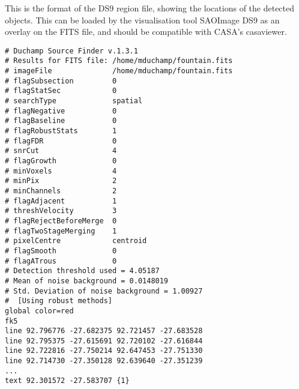 %
%
%
%
\label{app-ds9}

This is the format of the DS9 region file, showing the locations
of the detected objects. This can be loaded by the visualisation tool
SAOImage DS9 as an overlay on the FITS file, and should be compatible
with CASA's casaviewer.

\begin{verbatim}
# Duchamp Source Finder v.1.3.1
# Results for FITS file: /home/mduchamp/fountain.fits
# imageFile              /home/mduchamp/fountain.fits
# flagSubsection         0
# flagStatSec            0
# searchType             spatial
# flagNegative           0
# flagBaseline           0
# flagRobustStats        1
# flagFDR                0
# snrCut                 4
# flagGrowth             0
# minVoxels              4
# minPix                 2
# minChannels            2
# flagAdjacent           1
# threshVelocity         3
# flagRejectBeforeMerge  0
# flagTwoStageMerging    1
# pixelCentre            centroid
# flagSmooth             0
# flagATrous             0
# Detection threshold used = 4.05187
# Mean of noise background = 0.0148019
# Std. Deviation of noise background = 1.00927
#  [Using robust methods]
global color=red 
fk5
line 92.796776 -27.682375 92.721457 -27.683528
line 92.795375 -27.615691 92.720102 -27.616844
line 92.722816 -27.750214 92.647453 -27.751330
line 92.714730 -27.350128 92.639640 -27.351239
...
text 92.301572 -27.583707 {1}
\end{verbatim}

